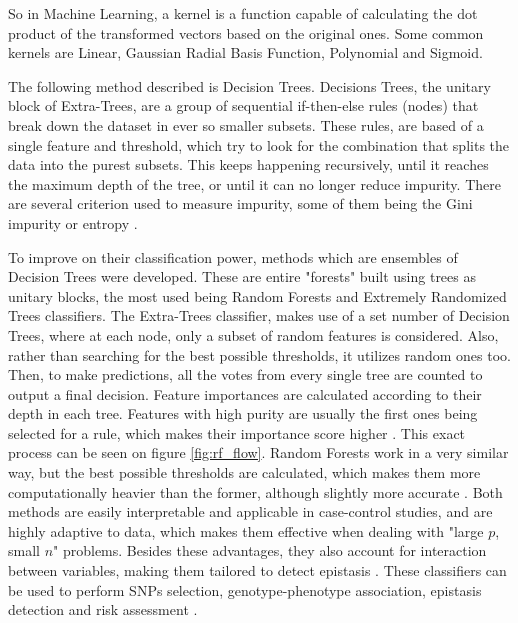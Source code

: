 So in Machine Learning, a kernel is a function capable of calculating the dot product of the transformed vectors based on the original ones. Some common kernels are Linear, Gaussian Radial Basis Function, Polynomial and Sigmoid. 

The following method described is Decision Trees. Decisions Trees, the unitary block of Extra-Trees, are a group of sequential if-then-else rules (nodes) that break down the dataset in ever so smaller subsets. These rules, are based of a single feature and threshold, which try to look for the combination that splits the data into the purest subsets. This keeps happening recursively, until it reaches the maximum depth of the tree, or until it can no longer reduce impurity. There are several criterion used to measure impurity, some of them being the Gini impurity or entropy \cite{moore2010bioinformatics,quinlan1986induction}. 

To improve on their classification power, methods which are ensembles of Decision Trees were developed. These are entire "forests" built using trees as unitary blocks, the most used being Random Forests and Extremely Randomized Trees classifiers. The Extra-Trees classifier, makes use of a set number of Decision Trees, where at each node, only a subset of random features is considered. Also, rather than searching for the best possible thresholds, it utilizes random ones too. Then, to make predictions, all the votes from every single tree are counted to output a final decision. Feature importances are calculated according to their depth in each tree. Features with high purity are usually the first ones being selected for a rule, which makes their importance score higher \cite{geurts2006extremely}. This exact process can be seen on figure \ref{fig:rf_flow}. Random Forests  work in a very similar way, but the best possible thresholds are calculated, which makes them more computationally heavier than the former, although slightly more accurate \cite{breiman2001random}. Both methods are easily interpretable and applicable in case-control studies, and are highly adaptive to data, which makes them effective when dealing with "large $p$, small $n$" problems. Besides these advantages, they also account for interaction between variables, making them tailored to detect epistasis \cite{chen2012random}. These classifiers can be used to perform \gls{SNP}s selection, genotype-phenotype association, epistasis detection and risk assessment \cite{meng2009performance, hwang2017biological}. 

